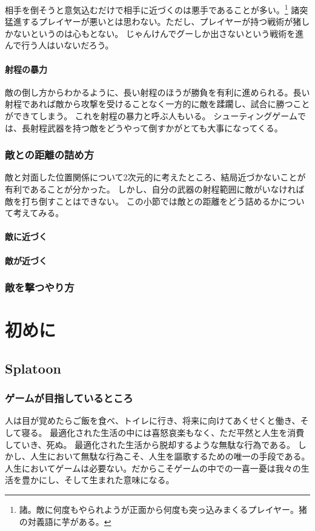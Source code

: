 \documentclass[a4paper,11pt]{jsbook}
\begin{document}
相手を倒そうと意気込むだけで相手に近づくのは悪手であることが多い。\footnote{諸。敵に何度もやられようが正面から何度も突っ込みまくるプレイヤー。猪の対義語に芋がある。}
諸突猛進するプレイヤーが悪いとは思わない。ただし、プレイヤーが持つ戦術が猪しかないというのは心もとない。
じゃんけんでグーしか出さないという戦術を進んで行う人はいないだろう。

\subsubsection{射程の暴力}
敵の倒し方からわかるように、長い射程のほうが勝負を有利に進められる。長い射程であれば敵から攻撃を受けることなく一方的に敵を蹂躙し、試合に勝つことができてしまう。
これを射程の暴力と呼ぶ人もいる。
シューティングゲームでは、長射程武器を持つ敵をどうやって倒すかがとても大事になってくる。

\subsection{敵との距離の詰め方}
敵と対面した位置関係について2次元的に考えたところ、結局近づかないことが有利であることが分かった。
しかし、自分の武器の射程範囲に敵がいなければ敵を打ち倒すことはできない。
この小節では敵との距離をどう詰めるかについて考えてみる。
\subsubsection{敵に近づく}


\subsubsection{敵が近づく}

\subsection{敵を撃つやり方}




\chapter{初めに}
\section{Splatoon}
\subsection{ゲームが目指しているところ}
人は目が覚めたらご飯を食べ、トイレに行き、将来に向けてあくせくと働き、そして寝る。
最適化された生活の中には喜怒哀楽もなく、ただ平然と人生を消費していき、死ぬ。
最適化された生活から脱却するような無駄な行為である。
しかし、人生において無駄な行為こそ、人生を謳歌するための唯一の手段である。
人生においてゲームは必要ない。だからこそゲームの中での一喜一憂は我々の生活を豊かにし、そして生まれた意味になる。
\end{document}
